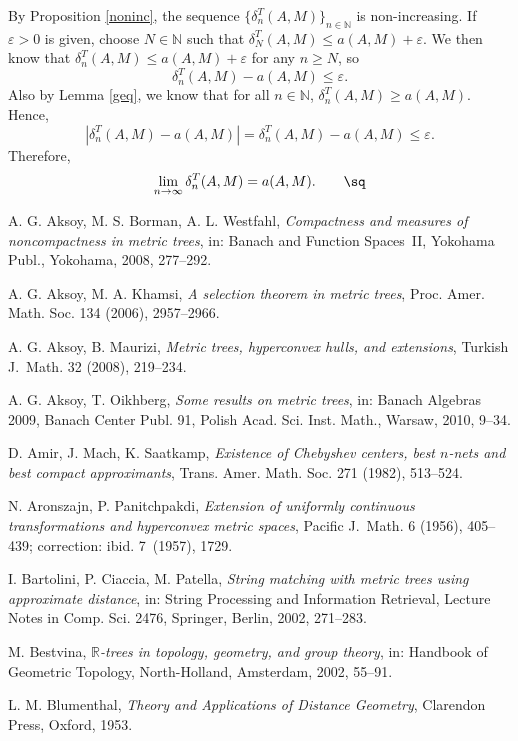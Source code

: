 \documentclass{bcp92}
\theoremstyle{plain}
\theoremstyle{definition}
\begin{document}
By Proposition \ref{noninc}, the sequence $\{ \delta_n^T(A,M) \}_{n \in
\mathbb{N}}$ is non-increasing. If $\varepsilon > 0$ is given, choose $N \in
\mathbb{N}$ such that $\delta_N^T(A,M) \leq a(A,M) + \varepsilon$. We then
know that $\delta_n^T(A,M) \leq a(A,M) + \varepsilon$ for any $n \geq N$, so
$$
\delta_n^T(A,M) - a(A,M) \leq \varepsilon.
$$
Also by Lemma \ref{geq}, we know that for all $n \in \mathbb{N}$,
$\delta_n^T(A,M) \geq a(A,M)$. Hence,
$$
| \delta_n^T(A,M) - a(A,M) | = \delta_n^T(A,M) - a(A,M) \leq \varepsilon.
$$
Therefore,
$$
\lim_{n \rightarrow \infty}{\delta_n^T(A,M)} = a(A,M).\qquad\sq
$$

\begin{thebibliography}{11}

A. G. Aksoy, M. S. Borman, A. L. Westfahl,
\emph{Compactness and measures of noncompactness in metric trees},
in: Banach and Function Spaces~II,
Yokohama Publ., Yokohama, 2008, 277--292.

A. G. Aksoy, M. A. Khamsi,
\emph{A selection theorem in metric trees},
Proc. Amer. Math. Soc. {134} (2006), 2957--2966.

A. G. Aksoy, B. Maurizi,
\emph{Metric trees, hyperconvex hulls, and extensions},
Turkish J.~Math. {32} (2008), 219--234.

A. G. Aksoy, T. Oikhberg,
\emph{Some results on metric trees},
in: Banach Algebras 2009,
Banach Center Publ. {91}, Polish Acad. Sci. Inst. Math., Warsaw, 2010, 9--34.

D. Amir, J. Mach, K. Saatkamp,
\emph{Existence of Chebyshev centers, best $n$-nets and best compact approximants},
Trans. Amer. Math. Soc. {271} (1982), 513--524.

N. Aronszajn, P. Panitchpakdi,
\emph{Extension of uniformly continuous transformations and hyperconvex metric spaces},
Pacific J.~Math. {6} (1956), 405--439; correction: ibid. {7}~(1957), 1729.

I. Bartolini, P. Ciaccia, M. Patella,
\emph{String matching with metric trees using approximate distance},
in: String Processing and Information Retrieval,
Lecture Notes in Comp. Sci. {2476},
Springer, Berlin, 2002, 271--283.

M. Bestvina,
\emph{$\mathbb{R}$-trees in topology, geometry, and group theory},
in: Handbook of Geometric Topology,
North-Holland, Amsterdam, 2002, 55--91.

L. M. Blumenthal,
\emph{Theory and Applications of Distance Geometry},
Clarendon Press, Oxford, 1953.


\end{thebibliography}
\end{document}
